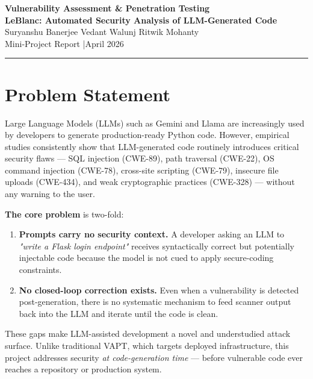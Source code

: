 \documentclass[11pt,a4paper]{article}
\begin{document}
\begin{center}
  {\LARGE\bfseries\color{accent} Vulnerability Assessment \& Penetration Testing}\\[4pt]
  {\large\bfseries LeBlanc: Automated Security Analysis of LLM-Generated Code}\\[10pt]
  {\normalsize
    Suryanshu Banerjee \quad Vedant Walunj \quad Ritwik Mohanty}\\[4pt]
  {\small\color{midgray} Mini-Project Report \quad|\quad April 2026}
\end{center}
\vspace{-4pt}
\noindent\rule{\linewidth}{1pt}
\vspace{6pt}

\section{Problem Statement}

Large Language Models (LLMs) such as Gemini and Llama are increasingly used by developers to generate production-ready Python code. However, empirical studies consistently show that LLM-generated code routinely introduces critical security flaws — SQL injection (CWE-89), path traversal (CWE-22), OS command injection (CWE-78), cross-site scripting (CWE-79), insecure file uploads (CWE-434), and weak cryptographic practices (CWE-328) — without any warning to the user.

\textbf{The core problem} is two-fold:

\begin{enumerate}[leftmargin=*, nosep]
  \item \textbf{Prompts carry no security context.} A developer asking an LLM to \textit{"write a Flask login endpoint"} receives syntactically correct but potentially injectable code because the model is not cued to apply secure-coding constraints.
  \item \textbf{No closed-loop correction exists.} Even when a vulnerability is detected post-generation, there is no systematic mechanism to feed scanner output back into the LLM and iterate until the code is clean.
\end{enumerate}

These gaps make LLM-assisted development a novel and understudied attack surface. Unlike traditional VAPT, which targets deployed infrastructure, this project addresses security \emph{at code-generation time} — before vulnerable code ever reaches a repository or production system.
\end{document}
